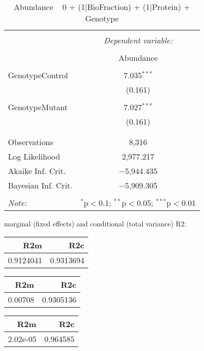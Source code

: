 \documentclass[11pt]{report}
\begin{document}
\begin{table}[!htbp] \centering 
  \caption{Abundance ~ 0 + (1|BioFraction) + (1|Protein) + Genotype} 
  \label{} 
\begin{tabular}{@{\extracolsep{5pt}}lc} 
\\[-1.8ex]\hline 
\hline \\[-1.8ex] 
 & \multicolumn{1}{c}{\textit{Dependent variable:}} \\ 
\cline{2-2} 
\\[-1.8ex] & Abundance \\ 
\hline \\[-1.8ex] 
 GenotypeControl & 7.035$^{***}$ \\ 
  & (0.161) \\ 
  & \\ 
 GenotypeMutant & 7.027$^{***}$ \\ 
  & (0.161) \\ 
  & \\ 
\hline \\[-1.8ex] 
Observations & 8,316 \\ 
Log Likelihood & 2,977.217 \\ 
Akaike Inf. Crit. & $-$5,944.435 \\ 
Bayesian Inf. Crit. & $-$5,909.305 \\ 
\hline 
\hline \\[-1.8ex] 
\textit{Note:}  & \multicolumn{1}{r}{$^{*}$p$<$0.1; $^{**}$p$<$0.05; $^{***}$p$<$0.01} \\ 
\end{tabular} 
\end{table} 
marginal (fixed effects) and conditional (total variance) R2:

\begin{tabular}{r|r}
\hline
R2m & R2c\\
\hline
0.9124041 & 0.9313694\\
\hline
\end{tabular}

\begin{tabular}{r|r}
\hline
R2m & R2c\\
\hline
0.00708 & 0.9305136\\
\hline
\end{tabular}

\begin{tabular}{r|r}
\hline
R2m & R2c\\
\hline
2.02e-05 & 0.964585\\
\hline
\end{tabular}
\end{document}
